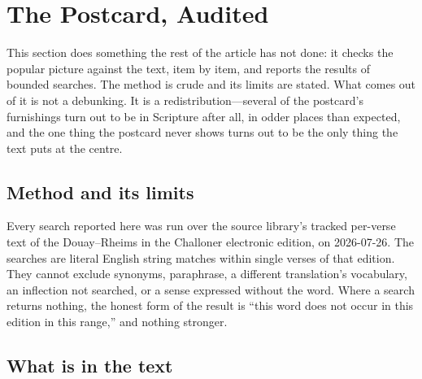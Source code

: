 \section{The Postcard, Audited}

This section does something the rest of the article has not done: it checks the popular picture against the text, item by item, and reports the results of bounded searches. The method is crude and its limits are stated. What comes out of it is not a debunking. It is a redistribution---several of the postcard's furnishings turn out to be in Scripture after all, in odder places than expected, and the one thing the postcard never shows turns out to be the only thing the text puts at the centre.

\subsection{Method and its limits}

Every search reported here was run over the source library's tracked per-verse text of the Douay--Rheims in the Challoner electronic edition, on 2026-07-26. The searches are literal English string matches within single verses of that edition. They cannot exclude synonyms, paraphrase, a different translation's vocabulary, an inflection not searched, or a sense expressed without the word. Where a search returns nothing, the honest form of the result is ``this word does not occur in this edition in this range,'' and nothing stronger.

\subsection{What is in the text}

